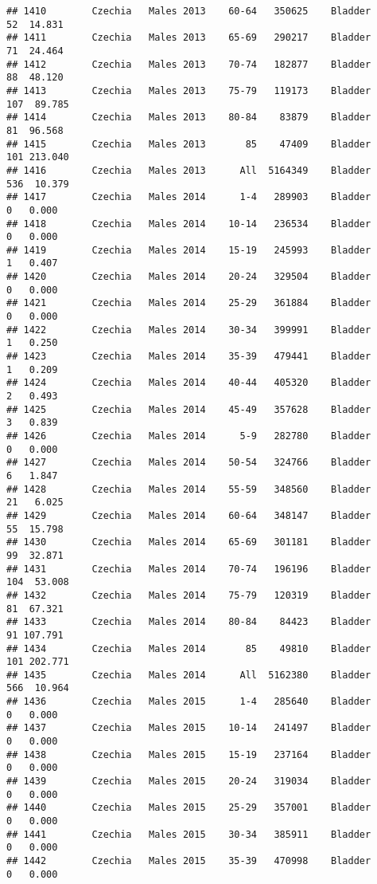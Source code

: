 \documentclass[
]{article}
\begin{document}
\begin{verbatim}
## 1410        Czechia   Males 2013    60-64   350625    Bladder     52  14.831
## 1411        Czechia   Males 2013    65-69   290217    Bladder     71  24.464
## 1412        Czechia   Males 2013    70-74   182877    Bladder     88  48.120
## 1413        Czechia   Males 2013    75-79   119173    Bladder    107  89.785
## 1414        Czechia   Males 2013    80-84    83879    Bladder     81  96.568
## 1415        Czechia   Males 2013       85    47409    Bladder    101 213.040
## 1416        Czechia   Males 2013      All  5164349    Bladder    536  10.379
## 1417        Czechia   Males 2014      1-4   289903    Bladder      0   0.000
## 1418        Czechia   Males 2014    10-14   236534    Bladder      0   0.000
## 1419        Czechia   Males 2014    15-19   245993    Bladder      1   0.407
## 1420        Czechia   Males 2014    20-24   329504    Bladder      0   0.000
## 1421        Czechia   Males 2014    25-29   361884    Bladder      0   0.000
## 1422        Czechia   Males 2014    30-34   399991    Bladder      1   0.250
## 1423        Czechia   Males 2014    35-39   479441    Bladder      1   0.209
## 1424        Czechia   Males 2014    40-44   405320    Bladder      2   0.493
## 1425        Czechia   Males 2014    45-49   357628    Bladder      3   0.839
## 1426        Czechia   Males 2014      5-9   282780    Bladder      0   0.000
## 1427        Czechia   Males 2014    50-54   324766    Bladder      6   1.847
## 1428        Czechia   Males 2014    55-59   348560    Bladder     21   6.025
## 1429        Czechia   Males 2014    60-64   348147    Bladder     55  15.798
## 1430        Czechia   Males 2014    65-69   301181    Bladder     99  32.871
## 1431        Czechia   Males 2014    70-74   196196    Bladder    104  53.008
## 1432        Czechia   Males 2014    75-79   120319    Bladder     81  67.321
## 1433        Czechia   Males 2014    80-84    84423    Bladder     91 107.791
## 1434        Czechia   Males 2014       85    49810    Bladder    101 202.771
## 1435        Czechia   Males 2014      All  5162380    Bladder    566  10.964
## 1436        Czechia   Males 2015      1-4   285640    Bladder      0   0.000
## 1437        Czechia   Males 2015    10-14   241497    Bladder      0   0.000
## 1438        Czechia   Males 2015    15-19   237164    Bladder      0   0.000
## 1439        Czechia   Males 2015    20-24   319034    Bladder      0   0.000
## 1440        Czechia   Males 2015    25-29   357001    Bladder      0   0.000
## 1441        Czechia   Males 2015    30-34   385911    Bladder      0   0.000
## 1442        Czechia   Males 2015    35-39   470998    Bladder      0   0.000

\end{verbatim}
\end{document}
